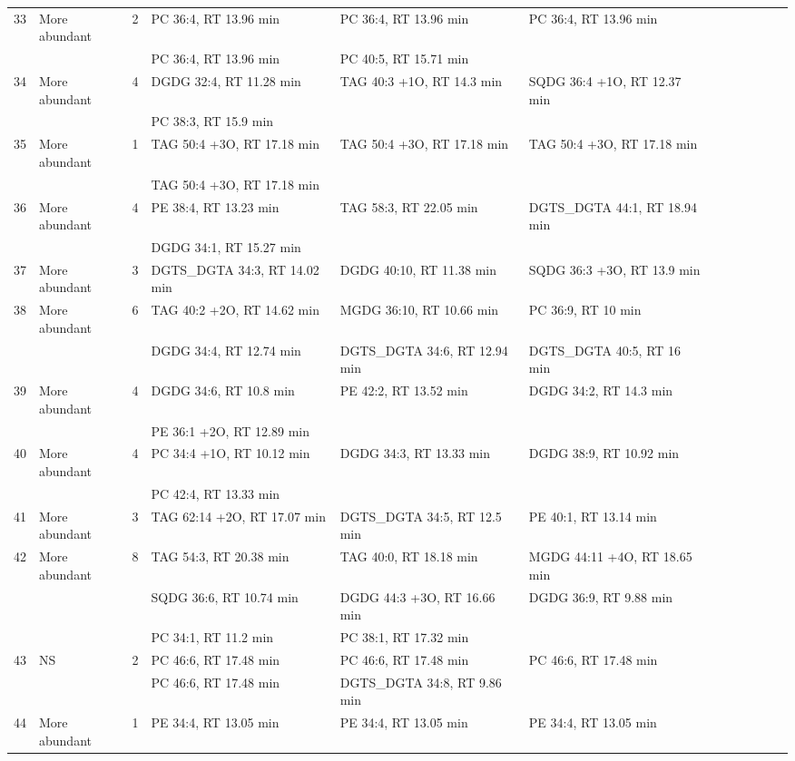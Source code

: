 \begin{landscape}
\begin{footnotesize}
\begin{singlespace}
\begin{flushleft}
\begin{longtable}{ Lp{.03\linewidth} Lp{.12\linewidth} Lp{.03\linewidth} Lp{.24\linewidth} Lp{.24\linewidth} Lp{.24\linewidth} }
33 & More abundant & 2 & PC 36:4, RT 13.96 min & PC 36:4, RT 13.96 min & PC 36:4, RT 13.96 min \\
 &  &  & PC 36:4, RT 13.96 min & PC 40:5, RT 15.71 min &  \\
34 & More abundant & 4 & DGDG 32:4, RT 11.28 min & TAG 40:3 +1O, RT 14.3 min & SQDG 36:4 +1O, RT 12.37 min \\
 &  &  & PC 38:3, RT 15.9 min &  &  \\
35 & More abundant & 1 & TAG 50:4 +3O, RT 17.18 min & TAG 50:4 +3O, RT 17.18 min & TAG 50:4 +3O, RT 17.18 min \\
 &  &  & TAG 50:4 +3O, RT 17.18 min &  &  \\
36 & More abundant & 4 & PE 38:4, RT 13.23 min & TAG 58:3, RT 22.05 min & DGTS\_DGTA 44:1, RT 18.94 min \\
 &  &  & DGDG 34:1, RT 15.27 min &  &  \\
37 & More abundant & 3 & DGTS\_DGTA 34:3, RT 14.02 min & DGDG 40:10, RT 11.38 min & SQDG 36:3 +3O, RT 13.9 min \\
38 & More abundant & 6 & TAG 40:2 +2O, RT 14.62 min & MGDG 36:10, RT 10.66 min & PC 36:9, RT 10 min \\
 &  &  & DGDG 34:4, RT 12.74 min & DGTS\_DGTA 34:6, RT 12.94 min & DGTS\_DGTA 40:5, RT 16 min \\
39 & More abundant & 4 & DGDG 34:6, RT 10.8 min & PE 42:2, RT 13.52 min & DGDG 34:2, RT 14.3 min \\
 &  &  & PE 36:1 +2O, RT 12.89 min &  &  \\
40 & More abundant & 4 & PC 34:4 +1O, RT 10.12 min & DGDG 34:3, RT 13.33 min & DGDG 38:9, RT 10.92 min \\
 &  &  & PC 42:4, RT 13.33 min &  &  \\
41 & More abundant & 3 & TAG 62:14 +2O, RT 17.07 min & DGTS\_DGTA 34:5, RT 12.5 min & PE 40:1, RT 13.14 min \\
42 & More abundant & 8 & TAG 54:3, RT 20.38 min & TAG 40:0, RT 18.18 min & MGDG 44:11 +4O, RT 18.65 min \\
 &  &  & SQDG 36:6, RT 10.74 min & DGDG 44:3 +3O, RT 16.66 min & DGDG 36:9, RT 9.88 min \\
 &  &  & PC 34:1, RT 11.2 min & PC 38:1, RT 17.32 min &  \\
43 & NS & 2 & PC 46:6, RT 17.48 min & PC 46:6, RT 17.48 min & PC 46:6, RT 17.48 min \\
 &  &  & PC 46:6, RT 17.48 min & DGTS\_DGTA 34:8, RT 9.86 min &  \\
44 & More abundant & 1 & PE 34:4, RT 13.05 min & PE 34:4, RT 13.05 min & PE 34:4, RT 13.05 min \\

\end{longtable}
\end{flushleft}
\end{singlespace}
\end{footnotesize}
\end{landscape}
